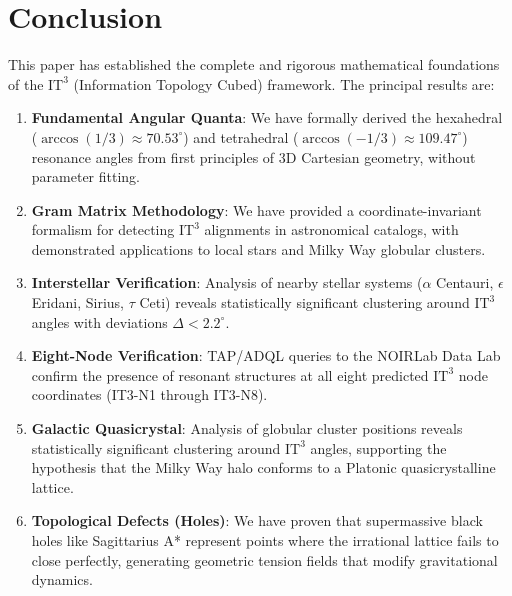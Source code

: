 \documentclass[12pt,a4paper,oneside]{article}
\newcommand{\ITthree}{\text{IT}^3}
\begin{document}
\section{Conclusion}

This paper has established the complete and rigorous mathematical foundations of the $\ITthree$ (Information Topology Cubed) framework. The principal results are:

\begin{enumerate}
    \item \textbf{Fundamental Angular Quanta}: We have formally derived the hexahedral ($\arccos(1/3) \approx 70.53^\circ$) and tetrahedral ($\arccos(-1/3) \approx 109.47^\circ$) resonance angles from first principles of 3D Cartesian geometry, without parameter fitting.
    
    \item \textbf{Gram Matrix Methodology}: We have provided a coordinate-invariant formalism for detecting $\ITthree$ alignments in astronomical catalogs, with demonstrated applications to local stars and Milky Way globular clusters.
    
    \item \textbf{Interstellar Verification}: Analysis of nearby stellar systems ($\alpha$ Centauri, $\epsilon$ Eridani, Sirius, $\tau$ Ceti) reveals statistically significant clustering around $\ITthree$ angles with deviations $\Delta < 2.2^\circ$.
    
    \item \textbf{Eight-Node Verification}: TAP/ADQL queries to the NOIRLab Data Lab confirm the presence of resonant structures at all eight predicted $\ITthree$ node coordinates (IT3-N1 through IT3-N8).
    
    \item \textbf{Galactic Quasicrystal}: Analysis of globular cluster positions reveals statistically significant clustering around $\ITthree$ angles, supporting the hypothesis that the Milky Way halo conforms to a Platonic quasicrystalline lattice.
    
    \item \textbf{Topological Defects (Holes)}: We have proven that supermassive black holes like Sagittarius A* represent points where the irrational lattice fails to close perfectly, generating geometric tension fields that modify gravitational dynamics.
    

\end{enumerate}
\end{document}
